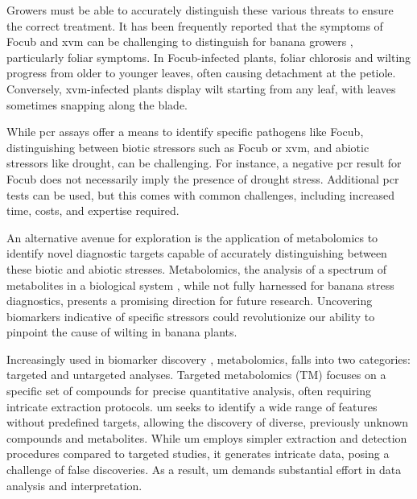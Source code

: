 Growers must be able to accurately distinguish these various threats to ensure the correct treatment. It has been frequently reported that the symptoms of \ac{Focub} and \ac{xvm} can be challenging to distinguish for banana growers \parencite{Stellenbosch24, PromusaSymps, Biruma2007}, particularly foliar symptoms. In \ac{Focub}-infected plants, foliar chlorosis and wilting progress from older to younger leaves, often causing detachment at the petiole. Conversely, \ac{xvm}-infected plants display wilt starting from any leaf, with leaves sometimes snapping along the blade. 

While \ac{pcr} assays offer a means to identify specific pathogens like \ac{Focub}, distinguishing between  biotic stressors such as \ac{Focub} or \ac{xvm}, and abiotic stressors like drought, can be challenging. For instance, a negative \ac{pcr} result for \ac{Focub} does not necessarily imply the presence of drought stress. Additional \ac{pcr} tests can be used, but this comes with common challenges, including increased time, costs, and expertise required.

An alternative avenue for exploration is the application of metabolomics to  identify novel diagnostic targets capable of accurately distinguishing between these biotic and abiotic stresses. Metabolomics, the analysis of a spectrum of metabolites in a biological system \parencite{Klassen2017}, while not fully harnessed for banana stress diagnostics, presents a promising direction for future research. Uncovering biomarkers indicative of specific stressors could revolutionize our ability to pinpoint the cause of wilting in banana plants.

Increasingly used in biomarker discovery \parencite{Li2016, Dang2018, Chen2023}, metabolomics, falls into two categories: targeted and untargeted analyses. Targeted metabolomics (TM) focuses on a specific set of compounds for precise quantitative analysis, often requiring intricate extraction protocols. \acf{um} seeks to identify a wide range of features without predefined targets, allowing the discovery of diverse, previously unknown compounds and metabolites. While \ac{um} employs simpler extraction and detection procedures compared to targeted studies, it generates intricate data, posing a challenge of false discoveries. As a result, \ac{um} demands substantial effort in data analysis and interpretation.

